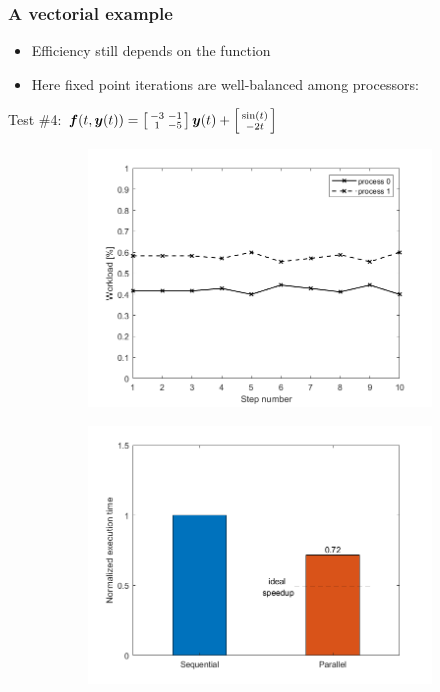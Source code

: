 \documentclass{beamer}
\begin{document}
\begin{frame} %
	\frametitle{A vectorial example}
	\begin{itemize}
		\item Efficiency still depends on the function
		\item Here fixed point iterations are well-balanced among processors:
	\end{itemize}	
	\begin{center}
		Test \#4: \quad
		$\boldsymbol f(t,\boldsymbol y(t)) =
		\left[\begin{smallmatrix} -3 & -1 \\ 1 & -5 \end{smallmatrix}\right]
		\boldsymbol y(t) +
		\left[\begin{smallmatrix} \sin(t) \\ -2t \end{smallmatrix}\right]$
	\end{center}
	\begin{figure}
		\begin{subfigure}{.5\textwidth}
			\includegraphics[width=\linewidth]{etc/test4_1.jpeg}
		\end{subfigure}%
		\begin{subfigure}{.5\textwidth}
			\includegraphics[width=\linewidth]{etc/test4_2.jpeg}

\end{subfigure}
\end{figure}
\end{frame}
\end{document}
